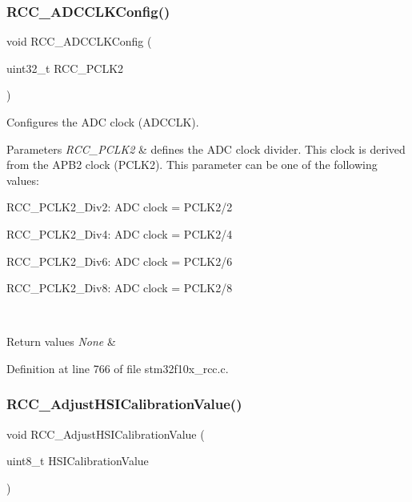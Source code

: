 \subsubsection{\texorpdfstring{R\+C\+C\+\_\+\+A\+D\+C\+C\+L\+K\+Config()}{RCC\_ADCCLKConfig()}}
{\footnotesize\ttfamily void R\+C\+C\+\_\+\+A\+D\+C\+C\+L\+K\+Config (\begin{DoxyParamCaption}\item[{uint32\+\_\+t}]{R\+C\+C\+\_\+\+P\+C\+L\+K2 }\end{DoxyParamCaption})}



Configures the A\+DC clock (A\+D\+C\+C\+LK). 


\begin{DoxyParams}{Parameters}
{\em R\+C\+C\+\_\+\+P\+C\+L\+K2} & defines the A\+DC clock divider. This clock is derived from the A\+P\+B2 clock (P\+C\+L\+K2). This parameter can be one of the following values\+: \begin{DoxyItemize}
\item R\+C\+C\+\_\+\+P\+C\+L\+K2\+\_\+\+Div2\+: A\+DC clock = P\+C\+L\+K2/2 \item R\+C\+C\+\_\+\+P\+C\+L\+K2\+\_\+\+Div4\+: A\+DC clock = P\+C\+L\+K2/4 \item R\+C\+C\+\_\+\+P\+C\+L\+K2\+\_\+\+Div6\+: A\+DC clock = P\+C\+L\+K2/6 \item R\+C\+C\+\_\+\+P\+C\+L\+K2\+\_\+\+Div8\+: A\+DC clock = P\+C\+L\+K2/8 \end{DoxyItemize}
\\
\hline
\end{DoxyParams}

\begin{DoxyRetVals}{Return values}
{\em None} & \\
\hline
\end{DoxyRetVals}


Definition at line 766 of file stm32f10x\+\_\+rcc.\+c.

\mbox{\label{group___r_c_c___exported___functions_gaa2d6a35f5c2e0f86317c3beb222677fc}} 
\subsubsection{\texorpdfstring{R\+C\+C\+\_\+\+Adjust\+H\+S\+I\+Calibration\+Value()}{RCC\_AdjustHSICalibrationValue()}}
{\footnotesize\ttfamily void R\+C\+C\+\_\+\+Adjust\+H\+S\+I\+Calibration\+Value (\begin{DoxyParamCaption}\item[{uint8\+\_\+t}]{H\+S\+I\+Calibration\+Value }\end{DoxyParamCaption})}



